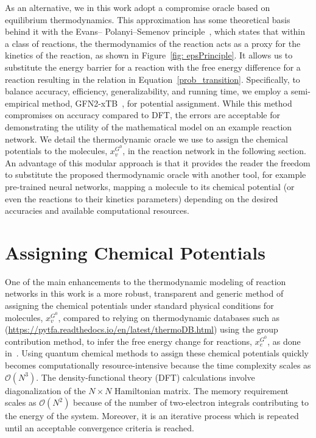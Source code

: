 As an alternative, we in this work adopt a compromise oracle based on equilibrium thermodynamics. This approximation has some theoretical basis behind it with the Evans– Polanyi–Semenov principle~\cite{epsPrinciple}, which states that within a class of reactions, the thermodynamics of the reaction acts as a proxy for the kinetics of the reaction, as shown in Figure~\ref{fig: epsPrinciple}. It allows us to substitute the energy barrier for a reaction with the free energy difference for a reaction resulting in the relation in Equation~\eqref{prob_transition}. Specifically, to balance accuracy, efficiency, generalizability, and running time, we employ a semi-empirical method, GFN2-xTB~\cite{grimme_xtb}, for potential assignment. While this method compromises on accuracy compared to DFT, the errors are acceptable for demonstrating the utility of the mathematical model on an example reaction network.
We detail the thermodynamic oracle we use to assign the chemical potentials to the molecules, $x_v^{G^0}$, in the reaction network in the following section.
An advantage of this modular approach is that it provides the reader the freedom to substitute the proposed thermodynamic oracle with another tool, for example pre-trained neural networks, mapping a molecule to its chemical potential (or even the reactions to their kinetics parameters) depending on the desired accuracies and available computational resources.

\section{Assigning Chemical Potentials}\label{first appendix}

One of the main enhancements to the thermodynamic modeling of reaction networks in this work is a more robust, transparent and generic method of assigning the chemical potentials under standard physical conditions for molecules, $x^{G^0}_v$,
compared to relying on thermodynamic databases such as (\url{https://pytfa.readthedocs.io/en/latest/thermoDB.html})
 using the group contribution method, to infer the free energy change for reactions, $x^{G^0}_e$, 
as done in~\cite{hatz_therm_python}.
Using quantum chemical methods to assign these chemical potentials quickly becomes computationally resource-intensive because the time complexity scales as $\mathcal{O}(N^3)$. The density-functional theory (DFT) calculations involve diagonalization of the $N\times N$ Hamiltonian matrix. 
The memory requirement scales as $\mathcal{O}(N^2)$ because of the number of two-electron integrals contributing to the energy of the system. Moreover, it is an iterative process which is repeated until an acceptable convergence criteria is reached.

